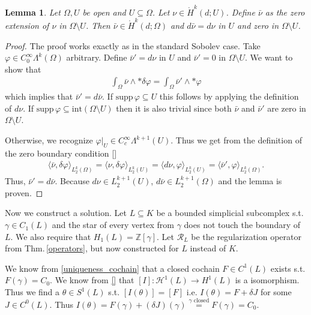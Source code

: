 \documentclass[12pt,a4paper]{article}
\newtheorem{lemma}{Lemma}
\theoremstyle{definition}
\newcommand{\integers}{\mathbb{Z}}
\newcommand{\smoothcompforms}[2]{C_0^\infty \Lambda^{#1}(#2)}
\newcommand{\rop}{\mathscr{R}} %
\begin{document}
\begin{lemma}\label{extension_by_zero}
    Let $\Omega, U$ be open and $U \subseteq \Omega$. 
    Let $\nu \in \mathring{H}^k(d;U)$. Define $\bar{\nu}$ as the 
    zero extension of $\nu$ in $\Omega \setminus U$. 
    Then $\bar{\nu} \in \mathring{H}^k(d;\Omega)$ and 
    $d\bar{\nu} = d\nu$ in $U$ and zero in $\Omega \setminus U$.
\end{lemma}
\begin{proof}
    The proof works exactly as in the standard Sobolev case. 
    Take $\varphi \in \smoothcompforms{k}{\Omega}$ arbitrary. 
    Define $\bar{\nu}' = d\nu$ in $U$ and $\bar{\nu}' = 0$ in 
    $\Omega \setminus U$. We want to show that 
    \begin{align*}
        \int_\Omega \bar{\nu} \wedge *\delta \varphi 
        = \int_\Omega \bar{\nu}' \wedge *\varphi
    \end{align*}
    which implies that $\bar{\nu}' = d\bar{\nu}$. If
    $\text{supp}\, \varphi \subseteq U$ this follows by applying the definition 
    of $d\nu$. If $\text{supp}\, \varphi \subseteq 
    \text{int}(\Omega \setminus U)$ then it is also trivial since both 
    $\bar{\nu}$ and $\bar{\nu}'$ are zero in $\Omega \setminus U$. 

    Otherwise, we recognize $\varphi |_U \in C_c^\infty \Lambda^{k+1}(U)$. 
    Thus we get from the definition of the zero boundary condition \ref{}
    \begin{align*}
        \langle \bar{\nu}, \delta \varphi \rangle_{L^k_2(\Omega)}
        = \langle \nu, \delta \varphi \rangle_{L^k_2(U)}
        = \langle d\nu, \varphi \rangle_{L^k_2(U)}
        = \langle \bar{\nu}', \varphi \rangle_{L^k_2(\Omega)}.
    \end{align*}
    Thus, $\bar{\nu}' = d\bar{\nu}$. Because $d\nu \in L^{k+1}_2(U)$,
    $d\bar{\nu} \in L^{k+1}_2(\Omega)$ and the lemma is proven.
\end{proof}

Now we construct a solution. Let $L \subseteq K$ be a bounded
simplicial subcomplex s.t. $\gamma \in C_1(L)$ and the star of 
every vertex from $\gamma$ does not touch the boundary of $L$. 
We also require that $H_1(L) = \integers [\gamma]$.
Let $\rop_L$ be 
the regularization operator from Thm.\,\ref{operators}, but now constructed for
$L$ instead of $K$.

We know from \ref{uniqueness_cochain} that a closed cochain $F \in C^1(L)$ 
exists s.t. $F(\gamma) = C_0$. 
We know from \ref{} that $[I]: \mathscr{H}^1(L) \rightarrow H^1(L)$ is a 
isomorphism. Thus we find a $\theta \in S^1(L)$ s.t. $[I(\theta)] = [F]$
i.e. $I(\theta) = F + \delta J$ for some $J\in C^0(L)$. Thus 
$I(\theta) = F(\gamma) + (\delta J)(\gamma) \stackrel{\gamma \text{ closed}}{=} 
F(\gamma) = C_0$.
\end{document}
